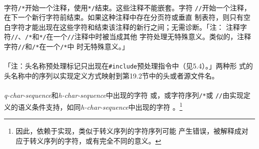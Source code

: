 \paragraph{}
字符\texttt{/*}开始一个注释，使用\texttt{*/}结束。这些注释不能嵌套。字符
\texttt{//}开始一个注释，在下一个新行字符前结束。如果这种注释中存在分页符或垂直
制表符，则只有空白字符才能出现在这些字符和结束该注释的新行之间；无需诊断。「注：
注释字符\texttt{//}、\texttt{/*}和\texttt{*/}在一个\texttt{//}注释中时被当成其他
字符处理无特殊意义。类似的，注释字符\texttt{//}和\texttt{/*}在一个\texttt{/*}中
时无特殊意义。」


\paragraph{}
「注：头名称预处理标记只出现在\texttt{\#include}预处理指令中（见5.4）。」两种形
式的头名称中的序列以实现定义方式映射到第19.2节中的头或者源文件名。

\paragraph{}
\textit{q-char-sequence}和\textit{h-char-sequence}中出现的字符
\texttt{\qsgl}或\texttt{\qdbl}，或字符序列\texttt{/*}或
\texttt{//}由实现定义的语义条件支持，如同\textit{h-char-sequence}中出现的字符
\texttt{\qdbl}。\footnote{因此，依赖于实现，类似于转义序列的字符序列可能
产生错误，被解释成对应于转义序列的字符，或有完全不同的意义。}


